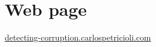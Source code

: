 \chapter*{Web page}


\begin{center}
\Large{\href{http://detecting-corruption.carlospetricioli.com}{detecting-corruption.carlospetricioli.com}}
\end{center}
\normalsize

\newpage


%  
% 
\thispagestyle{plain}
